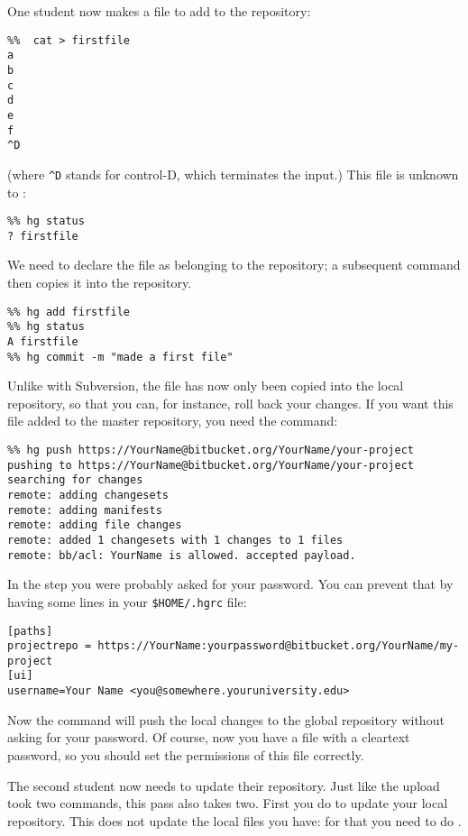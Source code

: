 One student now makes a file to add to the repository:
\begin{verbatim}
%%  cat > firstfile
a
b
c
d
e
f
^D
\end{verbatim}
(where \verb+^D+ stands for control-D, which terminates the input.)
This file is unknown to :
\begin{verbatim}
%% hg status
? firstfile
\end{verbatim}
We need to declare the file as belonging to the repository; a
subsequent  command then copies it into the repository.
\begin{verbatim}
%% hg add firstfile 
%% hg status
A firstfile
%% hg commit -m "made a first file"
\end{verbatim}
Unlike with Subversion, the file has now only been copied into the 
local repository, so that you can, for instance, roll back your
changes. If you want this file added to the master repository,
you need the  command:
\begin{verbatim}
%% hg push https://YourName@bitbucket.org/YourName/your-project
pushing to https://YourName@bitbucket.org/YourName/your-project
searching for changes
remote: adding changesets
remote: adding manifests
remote: adding file changes
remote: added 1 changesets with 1 changes to 1 files
remote: bb/acl: YourName is allowed. accepted payload.
\end{verbatim}
In the  step you were probably asked for your password. You can
prevent that by having some lines in your \verb+$HOME/.hgrc+ file:
{\footnotesize
\begin{verbatim}
[paths]
projectrepo = https://YourName:yourpassword@bitbucket.org/YourName/my-project
[ui]
username=Your Name <you@somewhere.youruniversity.edu>
\end{verbatim}
}
Now the command  will push the local changes
to the global repository without asking for your password. Of course,
now you have a file with a cleartext password, so you should set the
permissions of this file correctly.

The second student now needs to update their repository. Just like
the upload took two commands, this pass also takes two. First you do  to update your local repository. This does not update the local files you have: for that you need to do .


